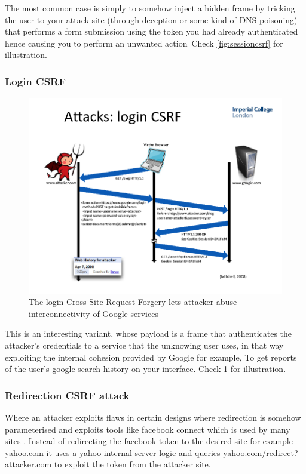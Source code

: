 The most common case is simply to somehow inject a hidden frame by tricking the user to your attack site (through deception or some kind of DNS poisoning)
that performs a form submission using the token you had already authenticated hence causing you to perform an unwanted action\ Check \ref{fig:sessioncsrf}
for illustration.

\subsubsection{Login CSRF}

\begin{figure}
\centering
\includegraphics[width=1\textwidth]{./logincsrf.png}
\caption{\label{fig:logincsrf}The login Cross Site Request Forgery lets attacker abuse interconnectivity of Google services}
\end{figure}

This is an interesting variant, whose payload is a frame that authenticates the attacker's credentials to a service that the unknowing user uses, in that way exploiting
the internal cohesion provided by Google for example, To get reports of the user's google search history on your interface. Check \ref{fig:logincsrf}
for illustration.

\subsubsection{Redirection CSRF attack}


Where an attacker exploits flaws in certain designs where redirection is somehow parameterised and exploits tools like facebook connect which is used by many sites .
Instead of redirecting the facebook token to the desired site for example yahoo.com it uses a yahoo internal server logic and queries yahoo.com/redirect?attacker.com to exploit
the token from the attacker site.



